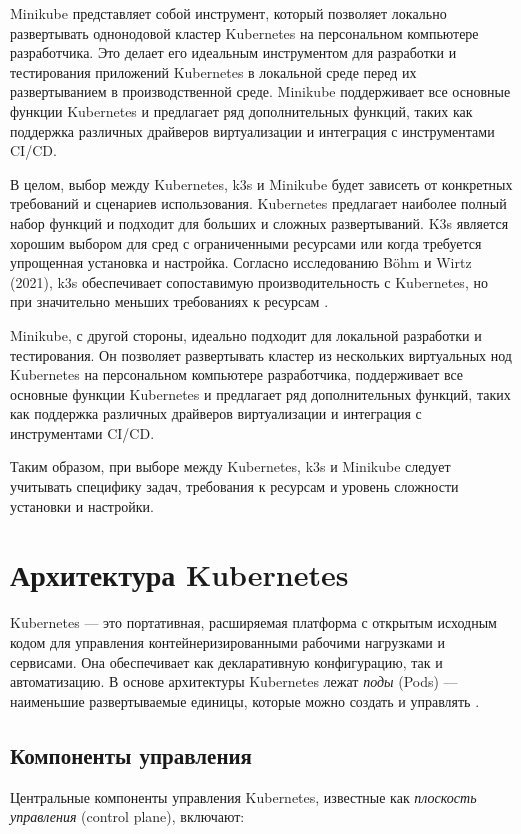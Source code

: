 Minikube представляет собой инструмент, который позволяет локально
развертывать однонодовой кластер Kubernetes на персональном компьютере
разработчика. Это делает его идеальным инструментом для разработки и 
тестирования приложений Kubernetes в локальной среде перед их
развертыванием в производственной среде. Minikube поддерживает все
основные функции Kubernetes и предлагает ряд дополнительных функций,
таких как поддержка различных драйверов виртуализации и интеграция с
инструментами CI/CD.

В целом, выбор между Kubernetes, k3s и Minikube будет зависеть от
конкретных требований и сценариев использования. Kubernetes предлагает
наиболее полный набор функций и подходит для больших и сложных
развертываний. K3s является хорошим выбором для сред с
ограниченными ресурсами или когда требуется упрощенная установка и
настройка. Согласно исследованию Böhm и Wirtz (2021), k3s обеспечивает
сопоставимую производительность с Kubernetes, но при значительно меньших
требованиях к ресурсам \cite{bohm2021profiling}.

Minikube, с другой стороны, идеально подходит для локальной
разработки и тестирования. Он позволяет развертывать кластер из нескольких
виртуальных нод Kubernetes на персональном компьютере разработчика,
поддерживает все основные функции Kubernetes и предлагает ряд
дополнительных функций, таких как поддержка различных драйверов
виртуализации и интеграция с инструментами CI/CD.

Таким образом, при выборе между Kubernetes, k3s и
Minikube следует учитывать специфику задач, требования
к ресурсам и уровень сложности установки и настройки.


\section{Архитектура Kubernetes}

Kubernetes — это портативная, расширяемая платформа с открытым исходным кодом
для управления контейнеризированными рабочими нагрузками и сервисами. Она
обеспечивает как декларативную конфигурацию, так и автоматизацию. В основе
архитектуры Kubernetes лежат \textit{поды} (Pods)  — наименьшие развертываемые единицы,
которые можно создать и управлять \cite{nocentino2021kubernetes}.

\subsection*{Компоненты управления}
Центральные компоненты управления Kubernetes, известные как \textit{плоскость управления}
(control plane), включают:

